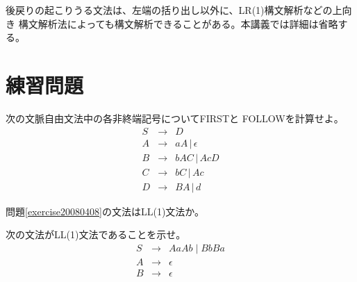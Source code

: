 後戻りの起こりうる文法は、左端の括り出し以外に、LR(1)構文解析などの上向き
構文解析法によっても構文解析できることがある。本講義では詳細は省略する。

\section*{練習問題}

\begin{exercise}\label{exercise20080408}
次の文脈自由文法中の各非終端記号について{\sffamily FIRST}と{\sffamily
 FOLLOW}を計算せよ。
\begin{eqnarray*}
 S & \rightarrow & D \\
 A & \rightarrow & aA \, |\, \epsilon \\
 B & \rightarrow & bAC \, |\, AcD \\
 C & \rightarrow & bC \, | \, Ac \\
 D & \rightarrow & BA \, | \, d
\end{eqnarray*}
\end{exercise}

\begin{exercise}
 問題\ref{exercise20080408}の文法はLL(1)文法か。
\end{exercise}

\begin{exercise}
 次の文法がLL(1)文法であることを示せ。
 \begin{eqnarray*}
  S & \rightarrow & AaAb \mid BbBa \\
  A & \rightarrow & \epsilon \\
  B & \rightarrow & \epsilon
 \end{eqnarray*}
\end{exercise}

